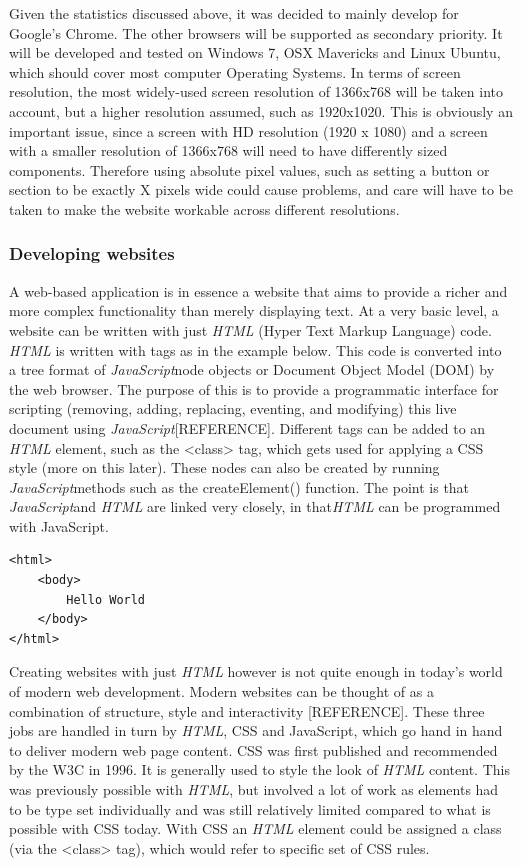 \documentclass[a4paper,11pt,twoside]{article}
\begin{document}
Given the statistics discussed above, it was decided to mainly develop for Google's Chrome. The other browsers will be supported as secondary priority. It will be developed and tested on Windows 7, OSX Mavericks and Linux Ubuntu, which should cover most computer Operating Systems. In terms of screen resolution, the most widely-used screen resolution of 1366x768 will be taken into account, but a higher resolution assumed, such as 1920x1020. This is obviously an important issue, since a screen with HD resolution (1920 x 1080) and a screen with a smaller resolution of 1366x768 will need to have differently sized components. Therefore using absolute pixel values, such as setting a button or section to be exactly X pixels wide could cause problems, and care will have to be taken to make the website workable across different resolutions.





\subsubsection{Developing websites}

A web-based application is in essence a website that aims to provide a richer and more complex functionality than merely displaying text. At a very basic level, a website can be written with just \textit{HTML} (Hyper Text Markup Language) code. \textit{HTML} is written with tags as in the example below. This code is converted into a tree format of \textit{JavaScript}node objects or Document Object Model (DOM) by the web browser. The purpose of this is to provide a programmatic interface for scripting (removing, adding, replacing, eventing, and modifying) this live document using \textit{JavaScript}[REFERENCE]. Different tags can be added to an \textit{HTML} element, such as the <class> tag, which gets used for applying a CSS style (more on this later). These nodes can also be created by running \textit{JavaScript}methods such as the createElement() function. The point is that \textit{JavaScript}and \textit{HTML} are linked very closely, in that\textit {HTML} can be programmed with JavaScript.

\begin{verbatim}
<html>
    <body>
        Hello World
    </body>
</html>
\end{verbatim}

Creating websites with just \textit{HTML} however is not quite enough in today's world of modern web development. Modern websites can be thought of as a combination of structure, style and interactivity [REFERENCE]. These three jobs are handled in turn by \textit{HTML}, CSS and JavaScript, which go hand in hand to deliver modern web page content. CSS was first published and recommended by the W3C in 1996. It is generally used to style the look of \textit{HTML} content. This was previously possible with \textit{HTML}, but involved a lot of work as elements had to be type set individually and was still relatively limited compared to what is possible with CSS today. With CSS an \textit{HTML} element could be assigned a class (via the <class> tag), which would refer to specific set of CSS rules.
\end{document}
